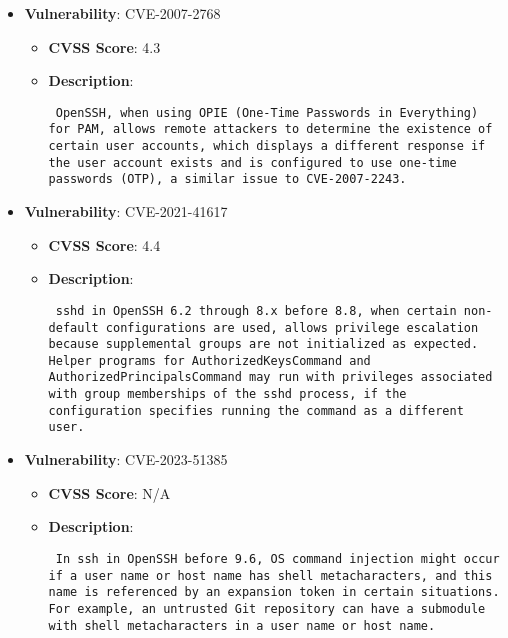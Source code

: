 \documentclass{article}
\begin{document}
\begin{itemize}
        \item \textbf{Vulnerability}: CVE-2007-2768
        \begin{itemize}
            \item \textbf{CVSS Score}:  4.3 
            \item \textbf{Description}: \parbox{\linewidth}{\texttt{ OpenSSH, when using OPIE (One-Time Passwords in Everything) for PAM, allows remote attackers to determine the existence of certain user accounts, which displays a different response if the user account exists and is configured to use one-time passwords (OTP), a similar issue to CVE-2007-2243. }}
        \end{itemize}
    
        \item \textbf{Vulnerability}: CVE-2021-41617
        \begin{itemize}
            \item \textbf{CVSS Score}:  4.4 
            \item \textbf{Description}: \parbox{\linewidth}{\texttt{ sshd in OpenSSH 6.2 through 8.x before 8.8, when certain non-default configurations are used, allows privilege escalation because supplemental groups are not initialized as expected. Helper programs for AuthorizedKeysCommand and AuthorizedPrincipalsCommand may run with privileges associated with group memberships of the sshd process, if the configuration specifies running the command as a different user. }}
        \end{itemize}
    
        \item \textbf{Vulnerability}: CVE-2023-51385
        \begin{itemize}
            \item \textbf{CVSS Score}:  N/A 
            \item \textbf{Description}: \parbox{\linewidth}{\texttt{ In ssh in OpenSSH before 9.6, OS command injection might occur if a user name or host name has shell metacharacters, and this name is referenced by an expansion token in certain situations. For example, an untrusted Git repository can have a submodule with shell metacharacters in a user name or host name. }}
        \end{itemize}
    

\end{itemize}
\end{document}
